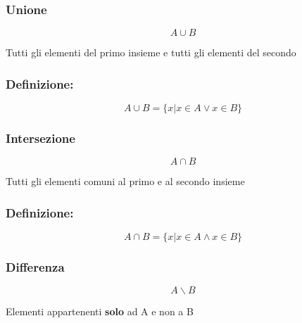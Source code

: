 \documentclass{article}
\begin{document}
    \subsubsection{Unione}
        \begin{LARGE}
            \begin{equation*}
                A \cup B
            \end{equation*}
        \end{LARGE}
        Tutti gli elementi del primo insieme e tutti gli elementi del secondo\newline
        
        \subsubsection*{Definizione:}
        
        \begin{LARGE}
            \begin{equation*}
                A \cup B = \{x | x \in A \vee x \in B\}
            \end{equation*}
        \end{LARGE}

        \subsubsection{Intersezione}
        \begin{LARGE}
            \begin{equation*}
                A \cap B
            \end{equation*}
        \end{LARGE}
        Tutti gli elementi comuni al primo e al secondo insieme\newline
        
        \subsubsection*{Definizione:}
        
        \begin{LARGE}
            \begin{equation*}
                A \cap B = \{x | x \in A \wedge x \in B\}
            \end{equation*}
        \end{LARGE}

        \subsubsection{Differenza}
        \begin{LARGE}
            \begin{equation*}
                A \backslash B
            \end{equation*}
        \end{LARGE}
        Elementi appartenenti \textbf{solo} ad A e non a B\newline
        
\end{document}
